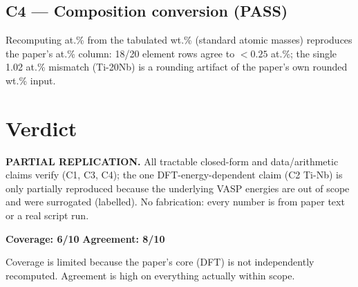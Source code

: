 \documentclass[11pt]{article}
\begin{document}
\subsection*{C4 --- Composition conversion (PASS)}
Recomputing at.\% from the tabulated wt.\% (standard atomic masses) reproduces the paper's at.\%
column: 18/20 element rows agree to $<0.25$ at.\%; the single 1.02 at.\% mismatch (Ti-20Nb) is a
rounding artifact of the paper's own rounded wt.\% input.

\section{Verdict}
\textbf{PARTIAL REPLICATION.} All tractable closed-form and data/arithmetic claims verify (C1, C3,
C4); the one DFT-energy-dependent claim (C2 Ti-Nb) is only partially reproduced because the
underlying VASP energies are out of scope and were surrogated (labelled). No fabrication: every
number is from paper text or a real script run.
\begin{center}
\textbf{Coverage: 6/10} \quad\quad \textbf{Agreement: 8/10}
\end{center}
Coverage is limited because the paper's core (DFT) is not independently recomputed. Agreement is
high on everything actually within scope.
\end{document}

